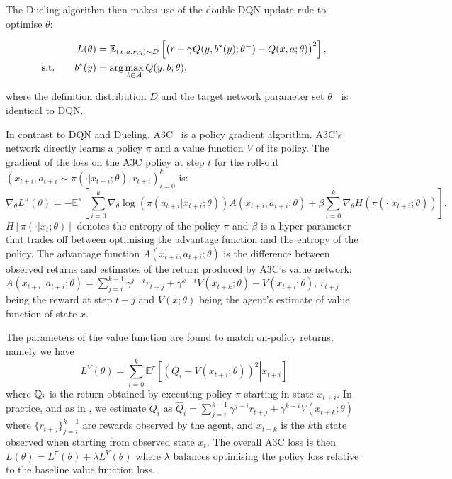 \documentclass{article}
\begin{document}
The Dueling algorithm then makes use of the double-DQN update rule \citep{van2016deep} to optimise $\theta$:

\begin{align}
L(\theta)&=\mathbb{E}_{(x,a,r,y)\sim D}\left[\left(r+ \gamma Q(y,b^*(y);\theta^-)-Q(x,a;\theta)\right)^2\right],
\\
\text{s.t.}\qquad b^*(y)&=\arg\max_{b\in\mathcal A}Q(y,b;\theta),
\end{align} 

where the definition distribution $D$ and the target network parameter set $\theta^-$ is identical to DQN. 

In contrast to DQN and Dueling, A3C~\citep{mnih2016asynchronous} is a policy gradient algorithm.
A3C's network directly learns a policy $\pi$  and a value function $V$ of its policy.
The gradient of the loss on the A3C policy at step $t$ for the roll-out $(x_{t+i},a_{t+i}\sim\pi(\cdot|x_{t+i};\theta),r_{t+i})_{i=0}^{k}$ is:
\begin{equation}
\nabla_{\theta}L^\pi(\theta)=-\mathbb{E}^\pi\left[\sum_{i=0}^k\nabla_{\theta}\log(\pi(a_{t+i}|x_{t+i};\theta))A(x_{t+i}, a_{t+i};\theta)+\beta\sum_{i=0}^k\nabla_{\theta} H(\pi(\cdot|x_{t+i};\theta))\right].
\end{equation}
$H[\pi(\cdot|x_t; \theta)]$ denotes the entropy of the policy $\pi$ and $\beta$ is a hyper parameter that trades off between optimising the advantage function and the entropy of the policy.
The advantage function $A(x_{t+i}, a_{t+i};\theta)$ is the difference between observed returns and estimates of the return produced by A3C's value network: $A(x_{t+i}, a_{t+i};\theta) = \sum_{j=i}^{k-1}\gamma^{j-i}r_{t+j}+\gamma^{k-i}V(x_{t+k};\theta) - V(x_{t+i};\theta)$, $r_{t+j}$ being the reward at step $t+j$ and $V(x;\theta)$ being the agent's estimate of value function of state $x$.

The parameters of the value function are found to match on-policy returns; namely we have 
\begin{equation}L^V(\theta) = \sum_{i=0}^k \mathbb{E}^\pi\left[(Q_i-V(x_{t+i};\theta))^2 \left|\right. x_{t+i} \right]\end{equation}
\noindent where $\mathbb{Q}_i$ is the return obtained by executing policy $\pi$ starting in state $x_{t+i}$.
In practice, and as in \cite{mnih2016asynchronous}, we estimate $Q_i$ as $\hat{Q}_i=\sum_{j=i}^{k-1}\gamma^{j-i}r_{t+j}+\gamma^{k-i}V(x_{t+k};\theta)$ where $\{r_{t+j}\}_{j=i}^{k-1}$ are rewards observed by the agent, and $x_{t+k}$ is the $k$th state observed when starting from observed state $x_t$.
The overall A3C loss is then $L(\theta) = L^\pi(\theta) + \lambda L^V(\theta)$ where $\lambda$ balances optimising the policy loss relative to the baseline value function loss.
\end{document}
